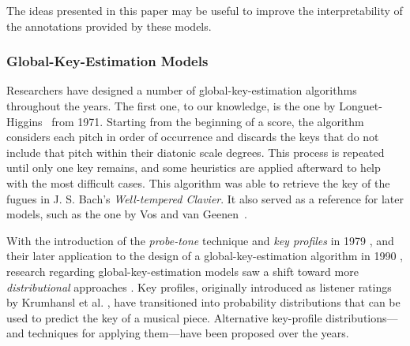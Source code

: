 The ideas presented in this paper may be useful to improve the interpretability of the annotations provided by these models.



\subsubsection{Global-Key-Estimation Models}
Researchers have designed a number of global-key-estimation algorithms throughout the years.
The first one, to our knowledge, is the one by Longuet-Higgins~\cite{longuet1971tonality} from 1971.
Starting from the beginning of a score, the algorithm considers each pitch in order of occurrence and discards the keys that do not include that pitch within their diatonic scale degrees.
This process is repeated until only one key remains, and some heuristics are applied afterward to help with the most difficult cases. This algorithm was able to retrieve the key of the fugues in J. S. Bach's \emph{Well-tempered Clavier}.
It also served as a reference for later models, such as the one by Vos and van Geenen~\cite{vos96keyfinding}.

With the introduction of the \emph{probe-tone} technique and \emph{key profiles} in 1979 \cite{krumhansl_quantification_1979}, and their later application to the design of a global-key-estimation algorithm in 1990 \cite{krumhansl_cognitive_1990}, research regarding global-key-estimation models saw a shift toward more \emph{distributional} approaches \cite{temperley2008pitch}.
Key profiles, originally introduced as listener ratings by Krumhansl et al. \cite{krumhansl_quantification_1979, krumhansl_tracing_1982}, have transitioned into probability distributions that can be used to predict the key of a musical piece.
Alternative key-profile distributions---and techniques for applying them---have been proposed over the years.


